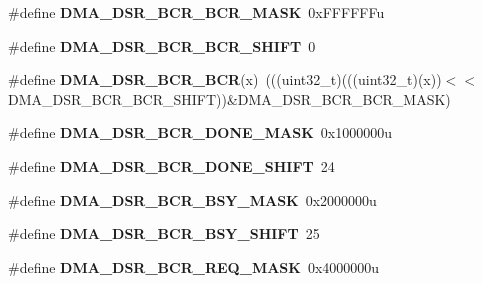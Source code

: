 \begin{DoxyCompactItemize}
\item 
\mbox{\label{group___d_m_a___register___masks_ga51f1a407dbca889f0b21bb1eeaa1c5d0}} 
\#define {\bfseries D\+M\+A\+\_\+\+D\+S\+R\+\_\+\+B\+C\+R\+\_\+\+B\+C\+R\+\_\+\+M\+A\+SK}~0x\+F\+F\+F\+F\+F\+Fu
\item 
\mbox{\label{group___d_m_a___register___masks_ga7eb36602370f4118640f57d51913ff89}} 
\#define {\bfseries D\+M\+A\+\_\+\+D\+S\+R\+\_\+\+B\+C\+R\+\_\+\+B\+C\+R\+\_\+\+S\+H\+I\+FT}~0
\item 
\mbox{\label{group___d_m_a___register___masks_gaa1f47d8804ae4a1f26265869b29a3a36}} 
\#define {\bfseries D\+M\+A\+\_\+\+D\+S\+R\+\_\+\+B\+C\+R\+\_\+\+B\+CR}(x)~(((uint32\+\_\+t)(((uint32\+\_\+t)(x))$<$$<$D\+M\+A\+\_\+\+D\+S\+R\+\_\+\+B\+C\+R\+\_\+\+B\+C\+R\+\_\+\+S\+H\+I\+FT))\&D\+M\+A\+\_\+\+D\+S\+R\+\_\+\+B\+C\+R\+\_\+\+B\+C\+R\+\_\+\+M\+A\+SK)
\item 
\mbox{\label{group___d_m_a___register___masks_gaaa733d9c65fb074a9e836b8abaa8173f}} 
\#define {\bfseries D\+M\+A\+\_\+\+D\+S\+R\+\_\+\+B\+C\+R\+\_\+\+D\+O\+N\+E\+\_\+\+M\+A\+SK}~0x1000000u
\item 
\mbox{\label{group___d_m_a___register___masks_gaa9063734a56a62385b42210acedc3144}} 
\#define {\bfseries D\+M\+A\+\_\+\+D\+S\+R\+\_\+\+B\+C\+R\+\_\+\+D\+O\+N\+E\+\_\+\+S\+H\+I\+FT}~24
\item 
\mbox{\label{group___d_m_a___register___masks_ga517e206a9b5422e95b875d13973d6888}} 
\#define {\bfseries D\+M\+A\+\_\+\+D\+S\+R\+\_\+\+B\+C\+R\+\_\+\+B\+S\+Y\+\_\+\+M\+A\+SK}~0x2000000u
\item 
\mbox{\label{group___d_m_a___register___masks_gaa9f53140b5fb6fbbf7cae9d4190bac47}} 
\#define {\bfseries D\+M\+A\+\_\+\+D\+S\+R\+\_\+\+B\+C\+R\+\_\+\+B\+S\+Y\+\_\+\+S\+H\+I\+FT}~25
\item 
\mbox{\label{group___d_m_a___register___masks_ga24c6d2ae6aa7b472b69e357ef0729902}} 
\#define {\bfseries D\+M\+A\+\_\+\+D\+S\+R\+\_\+\+B\+C\+R\+\_\+\+R\+E\+Q\+\_\+\+M\+A\+SK}~0x4000000u
$$
\end{DoxyCompactItemize}
